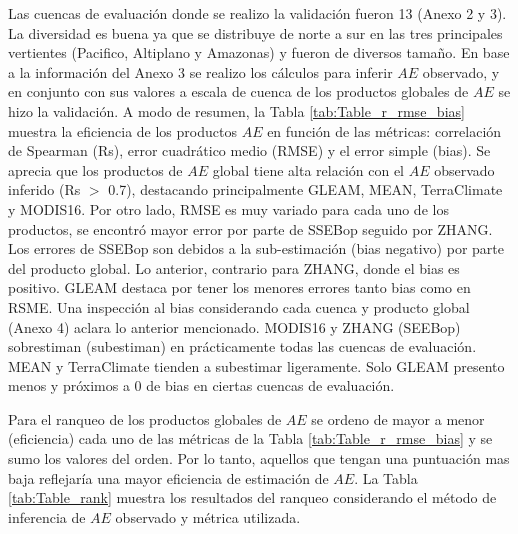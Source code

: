 \documentclass[12pt]{article}
\begin{document}
Las cuencas de evaluación donde se realizo la validación fueron 13 (Anexo 2 y 3). La diversidad es buena ya que se distribuye de norte a sur en las tres principales vertientes (Pacifico, Altiplano y Amazonas) y fueron de diversos tamaño. En base a la información del Anexo 3 se realizo los cálculos para inferir $AE$ observado, y en conjunto con sus valores a escala de cuenca de los productos globales de $AE$ se hizo la validación. A modo de resumen, la Tabla \ref{tab:Table_r_rmse_bias} muestra la eficiencia de los productos $AE$ en función de las métricas: correlación de Spearman (Rs), error cuadrático medio (RMSE) y el error simple (bias). Se aprecia que los productos de $AE$ global tiene alta relación con el $AE$ observado inferido (Rs $>$ 0.7), destacando principalmente GLEAM, MEAN, TerraClimate y MODIS16. Por otro lado, RMSE es muy variado para cada uno de los productos, se encontró mayor error por parte de SSEBop seguido por ZHANG. Los errores de SSEBop son debidos a la sub-estimación (bias negativo) por parte del producto global. Lo anterior, contrario para ZHANG, donde el bias es positivo. GLEAM destaca por tener los menores errores tanto bias como en RSME. Una inspección al bias considerando cada cuenca y producto global (Anexo 4) aclara lo anterior mencionado. MODIS16 y ZHANG (SEEBop) sobrestiman (subestiman) en prácticamente todas las cuencas de evaluación. MEAN y TerraClimate tienden a subestimar ligeramente. Solo GLEAM presento menos y próximos a 0 de bias en ciertas cuencas de evaluación.



Para el ranqueo de los productos globales de $AE$ se ordeno de mayor a menor (eficiencia) cada uno de las métricas de la Tabla \ref{tab:Table_r_rmse_bias} y se sumo los valores del orden. Por lo tanto, aquellos que tengan una puntuación mas baja reflejaría una mayor eficiencia de estimación de $AE$. La Tabla \ref{tab:Table_rank} muestra los resultados del ranqueo considerando el método de inferencia de $AE$ observado y métrica utilizada. 


\end{document}
